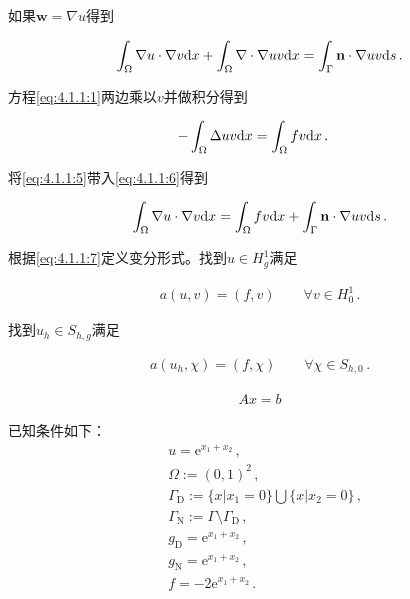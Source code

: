 如果$\mathbf w=\nabla u$得到

\begin{align}\label{eq:4.1.1:5}
  \int_{\Omega}\nabla u \cdot \nabla v  \mathrm{d} x  + \int_{\Omega}\nabla\cdot\nabla u  v  \mathrm{d} x = \int_{\Gamma}\mathbf n \cdot \nabla u v\mathrm{d} s \,.
\end{align}

方程\eqref{eq:4.1.1:1}两边乘以$v$并做积分得到

\begin{align}\label{eq:4.1.1:6}
  -\int_{\Omega}\Delta uv\mathrm{d} x &= \int_{\Omega}fv\mathrm{d} x\,.
\end{align}

将\eqref{eq:4.1.1:5}带入\eqref{eq:4.1.1:6}得到
   
\begin{align}\label{eq:4.1.1:7}
  \int_{\Omega}\nabla u \cdot \nabla v  \mathrm{d} x = \int_{\Omega}fv\mathrm{d} x + \int_{\Gamma}\mathbf n \cdot \nabla u v\mathrm{d} s\,.
\end{align}

根据\eqref{eq:4.1.1:7}定义变分形式。找到$u\in H^1_g$满足

\begin{align}   
  a(u,v)=(f,v) \qquad \forall v\in H^1_0\,.
\end{align}

找到$u_h\in S_{h,g}$满足

\begin{align}   
  a(u_h,\chi)=(f,\chi) \qquad \forall \chi\in S_{h,0}\,.
\end{align}

\begin{align}   
  Ax = b
\end{align}

已知条件如下：
\begin{subequations}
  \begin{align*}
   &u=\mathrm e^{x_1+x_2}\,,\\
   &\Omega:=(0,1)^2\,,\\
   &\Gamma_{\mathrm D}:=\{x|x_1=0\}\bigcup\{x|x_2=0\}\,,\\
   &\Gamma_{\mathrm N}:=\Gamma\setminus\Gamma_{\mathrm D}\,, \\
   &g_{\mathrm D}=\mathrm e^{x_1+x_2}\,,\\
   &g_{\mathrm N}=\mathrm e^{x_1+x_2}\,,\\
    &f=-2\mathrm e^{x_1+x_2}\,.
  \end{align*}
\end{subequations}

